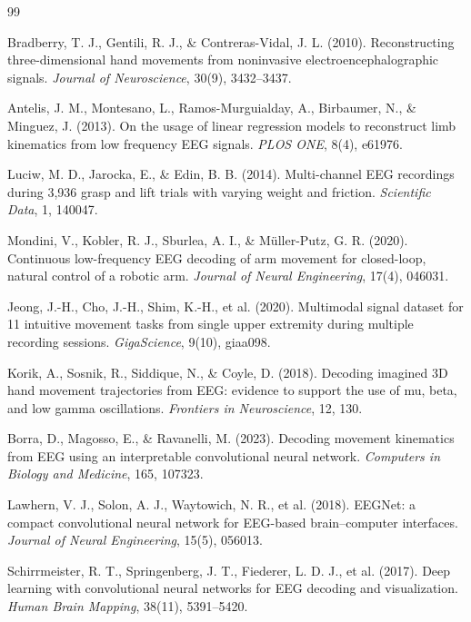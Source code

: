 \documentclass{article}
\begin{document}
\begin{thebibliography}{99}

Bradberry, T. J., Gentili, R. J., \& Contreras-Vidal, J. L. (2010). Reconstructing three-dimensional hand movements from noninvasive electroencephalographic signals. \textit{Journal of Neuroscience}, 30(9), 3432--3437.

Antelis, J. M., Montesano, L., Ramos-Murguialday, A., Birbaumer, N., \& Minguez, J. (2013). On the usage of linear regression models to reconstruct limb kinematics from low frequency EEG signals. \textit{PLOS ONE}, 8(4), e61976.

Luciw, M. D., Jarocka, E., \& Edin, B. B. (2014). Multi-channel EEG recordings during 3,936 grasp and lift trials with varying weight and friction. \textit{Scientific Data}, 1, 140047.

Mondini, V., Kobler, R. J., Sburlea, A. I., \& Müller-Putz, G. R. (2020). Continuous low-frequency EEG decoding of arm movement for closed-loop, natural control of a robotic arm. \textit{Journal of Neural Engineering}, 17(4), 046031.

Jeong, J.-H., Cho, J.-H., Shim, K.-H., et al. (2020). Multimodal signal dataset for 11 intuitive movement tasks from single upper extremity during multiple recording sessions. \textit{GigaScience}, 9(10), giaa098.

Korik, A., Sosnik, R., Siddique, N., \& Coyle, D. (2018). Decoding imagined 3D hand movement trajectories from EEG: evidence to support the use of mu, beta, and low gamma oscillations. \textit{Frontiers in Neuroscience}, 12, 130.

Borra, D., Magosso, E., \& Ravanelli, M. (2023). Decoding movement kinematics from EEG using an interpretable convolutional neural network. \textit{Computers in Biology and Medicine}, 165, 107323.

Lawhern, V. J., Solon, A. J., Waytowich, N. R., et al. (2018). EEGNet: a compact convolutional neural network for EEG-based brain--computer interfaces. \textit{Journal of Neural Engineering}, 15(5), 056013.

Schirrmeister, R. T., Springenberg, J. T., Fiederer, L. D. J., et al. (2017). Deep learning with convolutional neural networks for EEG decoding and visualization. \textit{Human Brain Mapping}, 38(11), 5391--5420.


\end{thebibliography}
\end{document}
